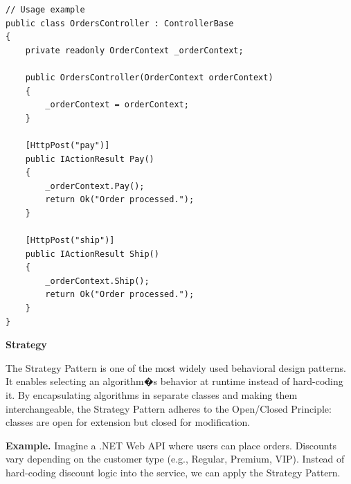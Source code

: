 \begin{lstlisting}
// Usage example
public class OrdersController : ControllerBase
{
    private readonly OrderContext _orderContext;

    public OrdersController(OrderContext orderContext)
    {
        _orderContext = orderContext;
    }

    [HttpPost("pay")]
    public IActionResult Pay()
    {
        _orderContext.Pay();
        return Ok("Order processed.");
    }

    [HttpPost("ship")]
    public IActionResult Ship()
    {
        _orderContext.Ship();
        return Ok("Order processed.");
    }
}

\end{lstlisting}







\medskip
\begin{center}
\textbf{Strategy}
\end{center}

The Strategy Pattern is one of the most widely used behavioral design patterns. It enables selecting an algorithm�s behavior at runtime instead of hard-coding it. By encapsulating algorithms in separate classes and making them interchangeable, the Strategy Pattern adheres to the Open/Closed Principle: classes are open for extension but closed for modification.

\textbf{Example.} Imagine a .NET Web API where users can place orders. Discounts vary depending on the customer type (e.g., Regular, Premium, VIP). Instead of hard-coding discount logic into the service, we can apply the Strategy Pattern.


